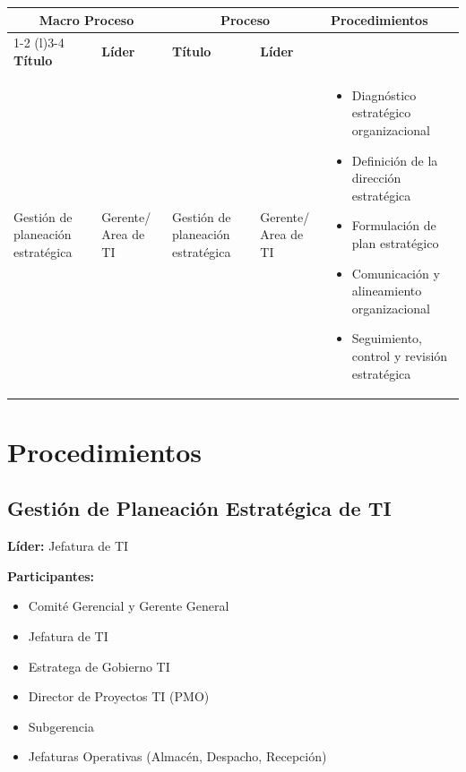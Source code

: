 \documentclass[11pt,letterpaper]{report}
\begin{document}
\vspace{7em}


\begin{center}
  \small
  \begin{tabularx}{\textwidth}{p{}p{}XXp{}}
  \toprule
  \multicolumn{2}{c}{\textbf{Macro Proceso}} & \multicolumn{2}{c}{\textbf{Proceso}} & \multirow{2}{*}{\textbf{Procedimientos}} \\
  \cmidrule(r){1-2} \cmidrule(l){3-4}
  \textbf{Título} & \textbf{Líder} & \textbf{Título} & \textbf{Líder} & \\
  \midrule
  Gestión de planeación estratégica & Gerente/ Area de TI & Gestión de planeación estratégica & Gerente/ Area de TI & 
  \begin{itemize} 
    \item Diagnóstico estratégico organizacional 
    \item Definición de la dirección estratégica 
    \item Formulación de plan estratégico 
    \item Comunicación y alineamiento organizacional 
    \item Seguimiento, control y revisión estratégica 
  \end{itemize} \\
  \bottomrule
  \end{tabularx}
\end{center}

\newpage

\chapter{Procedimientos}

\section{Gestión de Planeación Estratégica de TI}
\textbf{Líder:} Jefatura de TI

\textbf{Participantes:}
\begin{itemize}
  \item Comité Gerencial y Gerente General
  \item Jefatura de TI
  \item Estratega de Gobierno TI
  \item Director de Proyectos TI (PMO)
  \item Subgerencia
  \item Jefaturas Operativas (Almacén, Despacho, Recepción)
\end{itemize}
\end{document}
